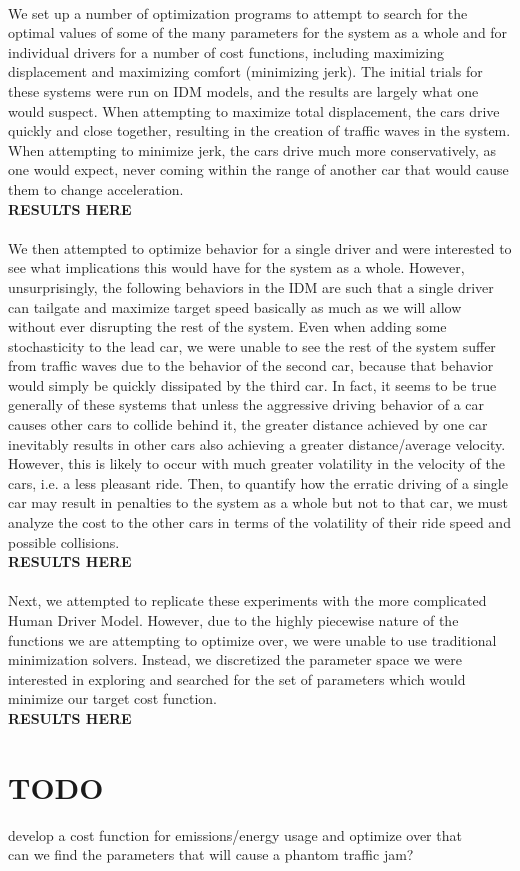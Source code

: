 \documentclass[11pt]{article}
\begin{document}
\paragraph{}We set up a number of optimization programs to attempt to search for the optimal values of some of the many parameters for the system as a whole and for individual drivers for a number of cost functions, including maximizing displacement and maximizing comfort (minimizing jerk). The initial trials for these systems were run on IDM models, and the results are largely what one would suspect. When attempting to maximize total displacement, the cars drive quickly and close together, resulting in the creation of traffic waves in the system. When attempting to minimize jerk, the cars drive much more conservatively, as one would expect, never coming within the range of another car that would cause them to change acceleration. \\
\textbf{RESULTS HERE}
\paragraph{}We then attempted to optimize behavior for a single driver and were interested to see what implications this would have for the system as a whole. However, unsurprisingly, the following behaviors in the IDM are such that a single driver can tailgate and maximize target speed basically as much as we will allow without ever disrupting the rest of the system. Even when adding some stochasticity to the lead car, we were unable to see the rest of the system suffer from traffic waves due to the behavior of the second car, because that behavior would simply be quickly dissipated by the third car. In fact, it seems to be true generally of these systems that unless the aggressive driving behavior of a car causes other cars to collide behind it, the greater distance achieved by one car inevitably results in other cars also achieving a greater distance/average velocity. However, this is likely to occur with much greater volatility in the velocity of the cars, i.e. a less pleasant ride. Then, to quantify how the erratic driving of a single car may result in penalties to the system as a whole but not to that car, we must analyze the cost to the other cars in terms of the volatility of their ride speed and possible collisions.\\
\textbf{RESULTS HERE}
\paragraph{}Next, we attempted to replicate these experiments with the more complicated Human Driver Model. However, due to the highly piecewise nature of the functions we are attempting to optimize over, we were unable to use traditional minimization solvers. Instead, we discretized the parameter space we were interested in exploring and searched for the set of parameters which would minimize our target cost function. \\
\textbf{RESULTS HERE}
\section{TODO}
develop a cost function for emissions/energy usage and optimize over that \\
can we find the parameters that will cause a phantom traffic jam?
\end{document}
